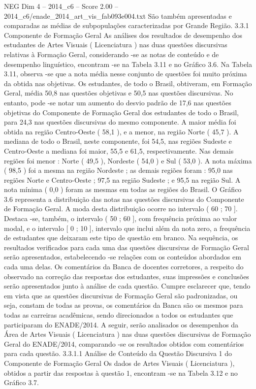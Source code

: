\begin{textsample}{NEG Dim 4 – 2014\_c6 – Score 2.00 – 2014\_c6/enade\_2014\_art\_vis\_fab093e004.txt}
São também apresentadas e comparadas as médias de subpopulações caracterizadas por Grande Região. 3.3.1 Componente de Formação Geral As análises dos resultados de desempenho dos estudantes de Artes Visuais ( Licenciatura ) nas duas questões discursivas relativas à Formação Geral, considerando -se as notas de conteúdo e de desempenho linguístico, encontram -se na Tabela 3.11 e no Gráfico 3.6.
Na Tabela 3.11, observa -se que a nota média nesse conjunto de questões foi muito próxima da obtida nas objetivas.
Os estudantes, de todo o Brasil, obtiveram, em Formação Geral, média 50,8 nas questões objetivas e 50,5 nas questões discursivas.
No entanto, pode -se notar um aumento do desvio padrão de 17,6 nas questões objetivas do Componente de Formação Geral dos estudantes de todo o Brasil, para 24,3 nas questões discursivas do mesmo componente.
A maior média foi obtida na região Centro-Oeste ( 58,1 ), e a menor, na região Norte ( 45,7 ).
A mediana de todo o Brasil, neste componente, foi 54,5, nas regiões Sudeste e Centro-Oeste a mediana foi maior, 55,5 e 61,5, respectivamente.
Nas demais regiões foi menor : Norte ( 49,5 ), Nordeste ( 54,0 ) e Sul ( 53,0 ).
A nota máxima ( 98,5 ) foi a mesma na região Nordeste ; as demais regiões foram : 95,0 nas regiões Norte e Centro-Oeste ; 97,5 na região Sudeste ; e 95,5 na região Sul.
A nota mínima ( 0,0 ) foram as mesmas em todas as regiões do Brasil.
O Gráfico 3.6 representa a distribuição das notas nas questões discursivas do Componente de Formação Geral.
A moda desta distribuição ocorre no intervalo ( 60 ; 70 ].
Destaca -se, também, o intervalo ( 50 ; 60 ], com frequência próxima ao valor modal, e o intervalo [ 0 ; 10 ], intervalo que inclui além da nota zero, a frequência de estudantes que deixaram este tipo de questão em branco.
Na sequência, os resultados verificados para cada uma das questões discursivas de Formação Geral serão apresentados, estabelecendo -se relações com os conteúdos abordados em cada uma delas.
Os comentários da Banca de docentes corretores, a respeito do observado na correção das respostas dos estudantes, suas impressões e conclusões serão apresentados junto à análise de cada questão.
Cumpre esclarecer que, tendo em vista que as questões discursivas de Formação Geral são padronizadas, ou seja, constam de todas as provas, os comentários da Banca são os mesmos para todas as carreiras acadêmicas, sendo direcionados a todos os estudantes que participaram do ENADE/2014.
A seguir, serão analisados os desempenhos da Área de Artes Visuais ( Licenciatura ) nas duas questões discursivas de Formação Geral do ENADE/2014, comparando -se os resultados obtidos com comentários para cada questão. 3.3.1.1 Análise de Conteúdo da Questão Discursiva 1 do Componente de Formação Geral Os dados de Artes Visuais ( Licenciatura ), obtidos a partir das respostas à questão 1, encontram -se na Tabela 3.12 e no Gráfico 3.7.

\end{textsample}
